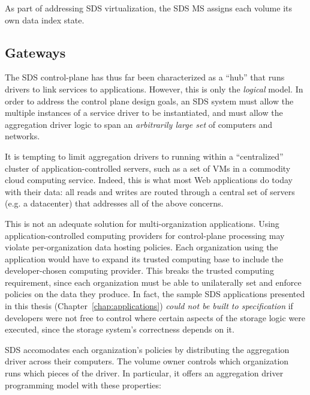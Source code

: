 As part of addressing SDS virtualization, the SDS MS assigns each volume 
its own data index state.

\subsection{Gateways}

The SDS control-plane has thus far been characterized as a ``hub'' that
runs drivers to link services to applications.  However, this is only the \emph{logical} model.
In order to address the control plane design goals, an SDS system must
allow the multiple instances of a service driver to be instantiated, and
must allow the aggregation driver logic to
span an \emph{arbitrarily large set} of computers and networks. 

It is tempting to limit aggregation drivers to
running within a ``centralized'' cluster of application-controlled servers,
such as a set of VMs in a commodity cloud computing service.  Indeed, this is
what most Web applications do today with their data:  all reads and writes are routed through a
central set of servers (e.g. a datacenter) that addresses all of the above
concerns.

This is not an adequate solution for multi-organization applications.
Using application-controlled computing providers for control-plane processing
may violate per-organization data hosting policies.  Each organization using the application
would have to expand its trusted computing base to include the developer-chosen
computing provider.  This breaks the trusted computing requirement, since each
organization must be able to unilaterally set and enforce policies on the data
they produce.  In fact, the sample SDS applications presented in this thesis
(Chapter~\ref{chap:applications}) \emph{could not be built to specification} if
developers were not free to control where certain aspects of the storage logic
were executed, since the storage system's correctness depends on it.

SDS accomodates each organization's policies by distributing the aggregation
driver across their computers.  The volume owner controls which organization
runs which pieces of the driver.  In particular, it offers an aggregation driver
programming model with these properties:

